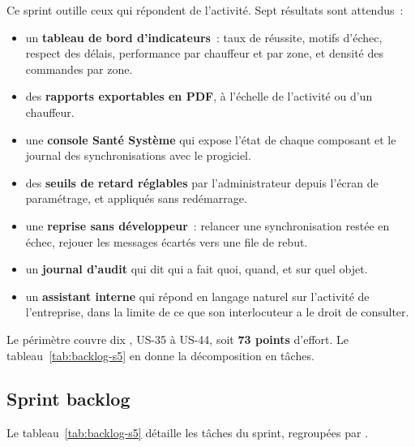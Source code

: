 Ce sprint outille ceux qui répondent de l'activité. Sept résultats sont attendus~:

\begin{itemize}
  \item un \textbf{tableau de bord d'indicateurs}~: taux de réussite, motifs d'échec, respect des
        délais, performance par chauffeur et par zone, et densité des commandes par zone.
  \item des \textbf{rapports exportables en PDF}, à l'échelle de l'activité ou d'un chauffeur.
  \item une \textbf{console Santé Système} qui expose l'état de chaque composant et le journal des
        synchronisations avec le progiciel.
  \item des \textbf{seuils de retard réglables} par l'administrateur depuis l'écran de paramétrage,
        et appliqués sans redémarrage.
  \item une \textbf{reprise sans développeur}~: relancer une synchronisation restée en échec, rejouer
        les messages écartés vers une file de rebut.
  \item un \textbf{journal d'audit} qui dit qui a fait quoi, quand, et sur quel objet.
  \item un \textbf{assistant interne} qui répond en langage naturel sur l'activité de l'entreprise,
        dans la limite de ce que son interlocuteur a le droit de consulter.
\end{itemize}

Le périmètre couvre dix , US-35 à US-44, soit \textbf{73 points} d'effort. Le
tableau~\ref{tab:backlog-s5} en donne la décomposition en tâches.

\subsection{Sprint backlog}

Le tableau~\ref{tab:backlog-s5} détaille les tâches du sprint, regroupées par .

